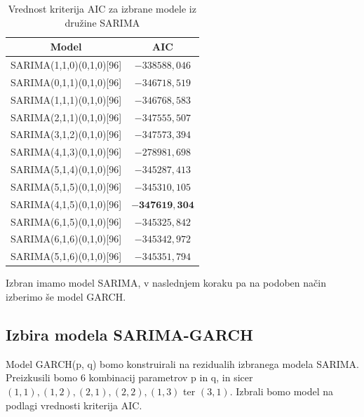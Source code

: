 \documentclass[a4paper, 11pt]{article}
\begin{document}
\begin{table}[!ht]
    \centering
    \caption{Vrednost kriterija AIC za izbrane modele iz družine SARIMA}\par\medskip
    \label{Tab:SARIMA_AIC}
    \begin{tabular}{c|c}
        Model & AIC \\ \hline
        SARIMA(1,1,0)(0,1,0)[96] & $-338588{,}046$ \\ 
        SARIMA(0,1,1)(0,1,0)[96] & $-346718{,}519$ \\ 
        SARIMA(1,1,1)(0,1,0)[96] & $-346768{,}583$ \\ 
        SARIMA(2,1,1)(0,1,0)[96] & $-347555{,}507$ \\ 
        SARIMA(3,1,2)(0,1,0)[96] & $-347573{,}394$ \\ 
        SARIMA(4,1,3)(0,1,0)[96] & $-278981{,}698$ \\ 
        SARIMA(5,1,4)(0,1,0)[96] & $-345287{,}413$ \\ 
        SARIMA(5,1,5)(0,1,0)[96] & $-345310{,}105$ \\ 
        SARIMA(4,1,5)(0,1,0)[96] & $\mathbf{-347619{,}304}$ \\ 
        SARIMA(6,1,5)(0,1,0)[96] & $-345325{,}842$ \\ 
        SARIMA(6,1,6)(0,1,0)[96] & $-345342{,}972$ \\ 
        SARIMA(5,1,6)(0,1,0)[96] & $-345351{,}794$ \\
    \end{tabular}
\end{table}

\noindent Izbran imamo model SARIMA, v naslednjem koraku pa na podoben način izberimo še model GARCH. 


\subsection{Izbira modela SARIMA-GARCH}

Model GARCH(p, q) bomo konstruirali na rezidualih izbranega modela SARIMA. Preizkusili bomo $6$ kombinacij 
parametrov p in q, in sicer $(1,1), (1,2), (2,1), (2,2), (1,3)$ ter $(3,1)$. Izbrali bomo model na podlagi
vrednosti kriterija AIC. 
\end{document}
